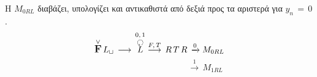 \par Η $M_{0RL}$ διαβάζει, υπολογίζει και αντικαθιστά από δεξιά προς τα αριστερά για $y_n\,=\,0$.
\reducevspace\reducevspace\reducevspace\reducevspace\reducevspace\reducevspace\reducevspace\reducevspace\reducevspace
\reducevspace\reducevspace\reducevspace\reducevspace\reducevspace\reducevspace\reducevspace\reducevspace\reducevspace
\[\overset{\lor}{{\text{\large\bfseries F}}}\,L_\sqcup\, \longrightarrow\,
\overset{0,\,1}{\overset{\botcircleleft}{L}}
\overset{F,\,T}{\longrightarrow}\, R\,T\,R\,\xrightarrow{0} M_{0RL}\]
\reducevspace\reducevspace\reducevspace\reducevspace\reducevspace\reducevspace\reducevspace
\reducevspace\reducevspace\reducevspace\reducevspace\reducevspace\reducevspace\reducevspace
\reducevspace\reducevspace\reducevspace\reducevspace\reducevspace\reducevspace\reducevspace
\reducevspace\reducevspace\reducevspace\reducevspace\reducevspace\reducevspace\reducevspace
\[\qquad\qquad\qquad\qquad\qquad\;\;\,\xrightarrow{1}\, M_{1RL}\]


